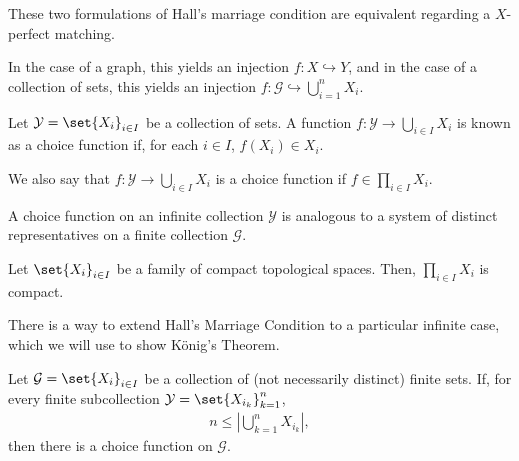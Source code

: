 \documentclass[10pt]{mypackage}
\begin{document}
  \begin{remark}
    These two formulations of Hall's marriage condition are equivalent regarding a $X$-perfect matching.\newline

    In the case of a graph, this yields an injection $f: X\hookrightarrow Y$, and in the case of a collection of sets, this yields an injection $f: \mathcal{G}\hookrightarrow \bigcup_{i=1}^{n}X_i$.\newline
  \end{remark}
  \begin{definition}
    Let $\mathcal{Y} = \set{X_i}_{i\in I}$ be a collection of sets. A function $f: \mathcal{Y}\rightarrow \bigcup_{i\in I}X_i$ is known as a choice function if, for each $i\in I$, $f\left(X_i\right)\in X_i$.\newline

    We also say that $f: \mathcal{Y}\rightarrow \bigcup_{i\in I}X_i$ is a choice function if $f\in \prod_{i\in I}X_i$.
  \end{definition}
  \begin{remark}
    A choice function on an infinite collection $\mathcal{Y}$ is analogous to a system of distinct representatives on a finite collection $\mathcal{G}$.
  \end{remark}
  \begin{theorem}[Tychonoff]
    Let $\set{X_i}_{i\in I}$ be a family of compact topological spaces. Then, $\prod_{i\in I}X_i$ is compact.
  \end{theorem}
  There is a way to extend Hall's Marriage Condition to a particular infinite case, which we will use to show König's Theorem.
  \begin{theorem}
    Let $\mathcal{G} = \set{X_i}_{i\in I}$ be a collection of (not necessarily distinct) finite sets. If, for every finite subcollection $\mathcal{Y} = \set{X_{i_k}}_{k=1}^{n}$,
    \begin{align*}
      n \leq \left\vert \bigcup_{k=1}^{n}X_{i_k} \right\vert,
    \end{align*}
    then there is a choice function on $\mathcal{G}$.
  \end{theorem}
\end{document}
